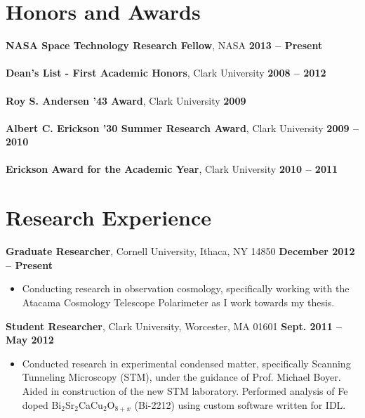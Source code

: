 \documentclass[margin,line]{res}
\begin{document}
\begin{resume}
\section{\sc Honors and Awards}  %
\textbf{NASA Space Technology Research Fellow}, NASA \hfill \textbf{2013 -- Present}\\
\\
\textbf{Dean's List - First Academic Honors}, Clark University \hfill \textbf{2008 -- 2012}\\ 
\\
\textbf{Roy S. Andersen '43 Award}, Clark University \hfill \textbf{2009}\\ 
\\
\textbf{Albert C. Erickson '30 Summer Research Award}, Clark University \hfill \textbf{2009 -- 2010}\\ 
\\
\textbf{Erickson Award for the Academic Year}, Clark University \hfill \textbf{2010 -- 2011}\\ 

\section{\sc Research Experience}      
    \textbf{Graduate Researcher}, Cornell University, Ithaca, NY 14850 \hfill \textbf{December 2012 -- Present}
    \vspace*{1mm}
    \begin{itemize}
        \item [ ] Conducting research in observation cosmology, specifically working with
        the Atacama Cosmology Telescope Polarimeter as I work towards my thesis.
    \end{itemize} 

    \textbf{Student Researcher}, Clark University, Worcester, MA 01601 \hfill \textbf{Sept. 2011 -- May 2012}
    \vspace*{1mm}
    \begin{itemize}
        \item [ ] Conducted research in experimental condensed matter, specifically
        Scanning Tunneling Microscopy (STM), under the guidance of Prof. Michael Boyer.
        Aided in construction of the new STM laboratory. Performed analysis of Fe doped
        Bi$_2$Sr$_2$CaCu$_2$O$_{8+x}$ (Bi-2212) using custom software written for IDL.
    \end{itemize} 


\end{resume}
\end{document}
